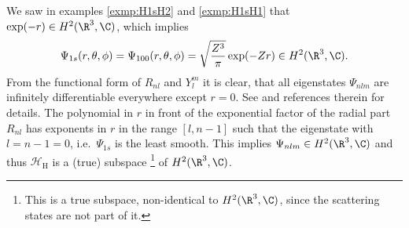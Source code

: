 We saw in examples \vref{exmp:H1sH2} and \vref{exmp:H1sH1}
that $\exp(-r) \in H^2(\R^3, \C)$,
which implies
\begin{equation}
	\Psi_{1s}(r, \theta, \phi) = \Psi_{100}(r, \theta, \phi)
	= \sqrt{\frac{Z^3}{\pi}} \exp(-Z r) \in H^2(\R^3, \C).
	\label{eqn:FunctionGShydrogen}
\end{equation}
From the functional form of $R_{nl}$ and $Y_l^m$ it is clear,
that all eigenstates $\Psi_{nlm}$ are infinitely differentiable everywhere
except $r = 0$.
See \cite{Kato1957} and references therein for details.
The polynomial in $r$ in front of the exponential factor of the radial part $R_{nl}$
has exponents in $r$ in the range $[l, n-1]$
such that the eigenstate with $l = n-1 = 0$, i.e.~$\Psi_{1s}$ is the least smooth.
This implies $\Psi_{nlm} \in H^2(\R^3, \C)$ and thus
$\mathcal{H}_\text{H}$ is a (true) subspace
\footnote{
	This is a true subspace, \ie non-identical to $H^2(\R^3, \C)$,
	since the scattering states are not part of it.
}
of $H^2(\R^3, \C)$.
